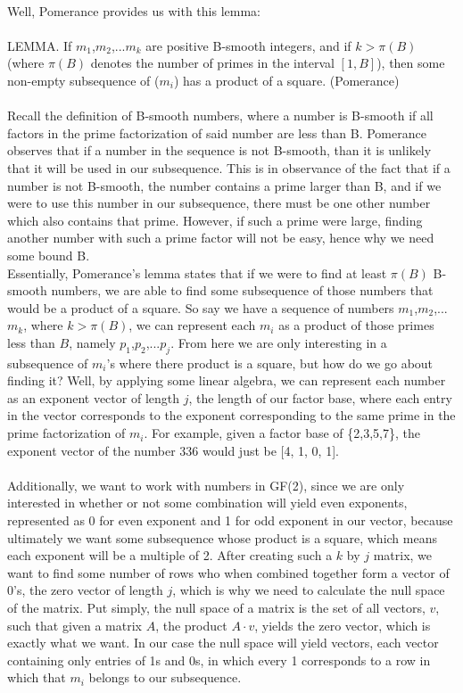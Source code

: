 \documentclass[12pt]{article} %
\begin{document}
	\\Well, Pomerance provides us with this lemma:
	\\\\LEMMA. If $m_1$,$m_2$,...$m_k$ are positive B-smooth integers, and if $k > \pi(B)$ (where $\pi\left(B\right)$ denotes the number of primes in the interval $[1, B]$), then some non-empty subsequence of ($m_i$) has a product of a square. (Pomerance)
	\\\\Recall the definition of B-smooth numbers, where a number is B-smooth if all factors in the prime factorization of said number are less than B. Pomerance observes that if a number in the sequence is not B-smooth, than it is unlikely that it will be used in our subsequence. This is in observance of the fact that if a number is not B-smooth, the number contains a prime larger than B, and if we were to use this number in our subsequence, there must be one other number which also contains that prime. However, if such a prime were large, finding another number with such a prime factor will not be easy, hence why we need some bound B. 
	\\\indent Essentially, Pomerance’s lemma states that if we were to find at least $\pi\left(B\right)$ B-smooth numbers, we are able to find some subsequence of those numbers that would be a product of a square. So say we have a sequence of numbers $m_1$,$m_2$,...$m_k$, where $k>\pi\left(B\right)$, we can represent each $m_i$ as a product of those primes less than $B$, namely $p_1$,$p_2$,...$p_j$. From here we are only interesting in a subsequence of $m_i$’s where there product is a square, but how do we go about finding it? Well, by applying some linear algebra, we can represent each number as an exponent vector of length $j$, the length of our factor base, where each entry in the vector corresponds to the exponent corresponding to the same prime in the prime factorization of $m_i$. For example, given a factor base of \{2,3,5,7\}, the exponent vector of the number 336 would just be [4, 1, 0, 1]. 
	\\\\ Additionally, we want to work with numbers in GF(2), since we are only interested in whether or not some combination will yield even exponents, represented as 0 for even exponent and 1 for odd exponent in our vector, because ultimately we want some subsequence whose product is a square, which means each exponent will be a multiple of 2. After creating such a $k$ by $j$ matrix, we want to find some number of rows who when combined together form a vector of 0's, the zero vector of length $j$, which is why we need to calculate the null space of the matrix. Put simply, the null space of a matrix is the set of all vectors, $v$, such that given a matrix $A$, the product $A\cdot v$, yields the zero vector, which is exactly what we want. In our case the null space will yield vectors, each vector containing only entries of 1s and 0s, in which every 1 corresponds to a row in which that $m_i$ belongs to our subsequence. 
\end{document}
